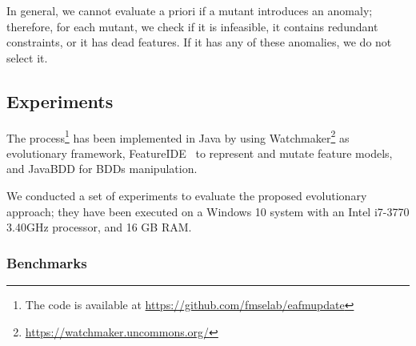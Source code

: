 \begin{tikzborder}{\cite{Gargantini16:validation}}
\begin{tikzborder}{\cite{gargantini_combinatorial_2017}}
\begin{tikzborder}{\cite{garn2019}}
\begin{tikzborder}{\cite{arcaini2019achieving}}
	In general, we cannot evaluate a priori if a mutant introduces an anomaly; therefore, for each mutant, we check if it is infeasible, it contains redundant constraints, or it has dead features. If it has any of these anomalies, we do not select it.\be
	
	\subsection{Experiments}\label{sec:experiments}
	
	\bb The process\footnote{The code is available at \url{https://github.com/fmselab/eafmupdate}} has been implemented in Java by using Watchmaker\footnote{\url{https://watchmaker.uncommons.org/}} as evolutionary framework, FeatureIDE~\cite{FeatureIDEbook} to represent and mutate feature models, and JavaBDD for BDDs manipulation. 
	
	We conducted a set of experiments to evaluate the proposed evolutionary approach; they have been executed on a Windows 10 system with an Intel i7-3770 3.40GHz processor, and 16 GB RAM.\be
	
	\subsubsection{Benchmarks}\label{sec:benchmarks1}
	

\end{tikzborder}
\end{tikzborder}
\end{tikzborder}
\end{tikzborder}
